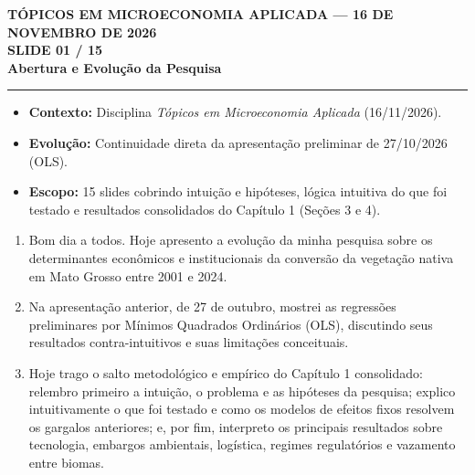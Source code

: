 \documentclass[11pt,a4paper]{article}
\newcommand{\slidenum}{1}
\begin{document}
\renewcommand{\slidenum}{1}
\noindent
\begin{minipage}{\textwidth}
\begin{center}
{\color{cinza}\footnotesize\textbf{TÓPICOS EM MICROECONOMIA APLICADA --- 16 DE NOVEMBRO DE 2026}\\[1.2mm]}
{\color{cinza}\bfseries\Large SLIDE 01 / 15\\[1.5mm]}
{\color{verde}\bfseries\LARGE Abertura e Evolução da Pesquisa\\[2.5mm]}
\rule{\textwidth}{1pt}
\end{center}
\end{minipage}
\vspace{1.5mm}

\begin{tcolorbox}[title={\bfseries\small ÂNCORAS EMPÍRICAS E CONCEITUAIS DO SLIDE}]
\begin{itemize}[leftmargin=*,itemsep=1mm,topsep=0.5mm]
    \item \textbf{Contexto:} Disciplina \textit{Tópicos em Microeconomia Aplicada} (16/11/2026).
    \item \textbf{Evolução:} Continuidade direta da apresentação preliminar de 27/10/2026 (OLS).
    \item \textbf{Escopo:} 15 slides cobrindo intuição e hipóteses, lógica intuitiva do que foi testado e resultados consolidados do Capítulo 1 (Seções 3 e 4).
\end{itemize}
\end{tcolorbox}
\vspace{2mm}

\vspace{0.8mm}
\begin{enumerate}[leftmargin=*,label=\textbf{(\arabic*)},itemsep=2.8mm,topsep=1mm]
    \item Bom dia a todos. Hoje apresento a evolução da minha pesquisa sobre os determinantes econômicos e institucionais da conversão da vegetação nativa em Mato Grosso entre 2001 e 2024.
    \item Na apresentação anterior, de 27 de outubro, mostrei as regressões preliminares por Mínimos Quadrados Ordinários (OLS), discutindo seus resultados contra-intuitivos e suas limitações conceituais.
    \item Hoje trago o salto metodológico e empírico do Capítulo 1 consolidado: relembro primeiro a intuição, o problema e as hipóteses da pesquisa; explico intuitivamente o que foi testado e como os modelos de efeitos fixos resolvem os gargalos anteriores; e, por fim, interpreto os principais resultados sobre tecnologia, embargos ambientais, logística, regimes regulatórios e vazamento entre biomas.
\end{enumerate}
\end{document}
